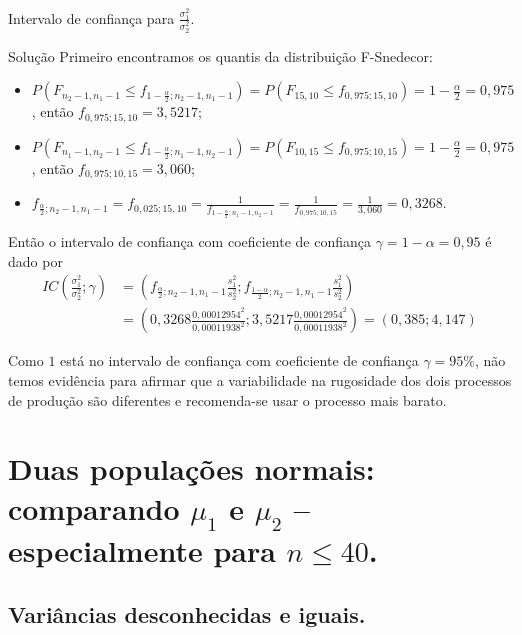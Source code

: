 \documentclass[9pt]{beamer}
\begin{document}
\begin{frame}{Intervalo de confiança para $\frac{\sigma_1^2}{\sigma_2^2}$.}

\footnotesize

\begin{block}{Solução}
	Primeiro encontramos os quantis da distribuição F-Snedecor:
	\begin{itemize}
		\item $P\left(F_{n_2-1, n_1-1} \leq f_{1-\frac{\alpha}{2};n_2-1, n_1-1} \right) = P\left(F_{15, 10} \leq f_{0,975;15, 10} \right) = 1-\frac{\alpha}{2} = 0,975$, então $f_{0,975;15, 10} = 3,5217$;
		\item $P\left(F_{n_1-1, n_2-1} \leq f_{1-\frac{\alpha}{2};n_1-1, n_2-1} \right) = P\left(F_{10, 15} \leq f_{0,975;10, 15} \right) =1- \frac{\alpha}{2} = 0,975$, então $f_{0,975;10, 15} = 3,060$;
		\item $f_{\frac{\alpha}{2}; n_2-1, n_1-1}  = f_{0,025; 15, 10} = \frac{1}{f_{1-\frac{\alpha}{2}; n_1-1, n_2-1}} = \frac{1}{f_{0,975; 10, 15}} = \frac{1}{3,060} = 0,3268$.
	\end{itemize}

Então o intervalo de confiança com coeficiente de confiança $\gamma = 1-\alpha=0,95$ é dado por
\begin{align*}
	IC\left(\frac{\sigma_1^2}{\sigma_2^2}; \gamma\right) &= \left( f_{\frac{\alpha}{2}; n_2-1, n_1-1} \frac{s_1^2}{s_2^2}; f_{\frac{1-\alpha}{2}; n_2-1, n_1-1} \frac{s_1^2}{s_2^2}  \right)\\
	&= \left( 0,3268 \frac{0,00012954^2}{0,00011938^2}; 3,5217 \frac{0,00012954^2}{0,00011938^2} \right) = (0,385; 4,147)
\end{align*}
\end{block}



Como $1$ está no intervalo de confiança com coeficiente de confiança $\gamma=95\%$, não temos evidência para afirmar que a variabilidade na rugosidade dos dois processos de produção são diferentes e recomenda-se usar o processo mais barato.

\normalsize
\end{frame}

\section{Duas populações normais: comparando $\mu_1$ e $\mu_2$ -- especialmente para $n \leq 40$.}

\subsection{Variâncias desconhecidas e iguais.}
\end{document}
